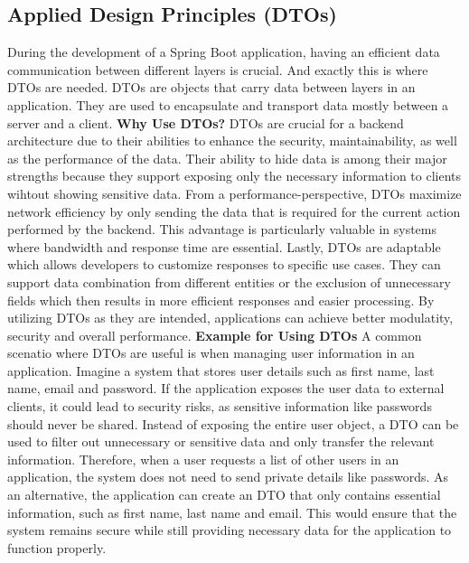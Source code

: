     \subsection{Applied Design Principles (DTOs)}
    During the development of a Spring Boot application, having an efficient data communication between different layers is crucial. And exactly this is where DTOs are needed. \newline
    DTOs are objects that carry data between layers in an application. They are used to encapsulate and transport data mostly between a server and a client.
    \newline
    \textbf{Why Use DTOs?} \newline
    DTOs are crucial for a backend architecture due to their abilities to enhance the security, maintainability, as well as the performance of the data. Their ability to hide data is among their major strengths because they support exposing only the necessary information to clients wihtout showing sensitive data. \newline
    From a performance-perspective, DTOs maximize network efficiency by only sending the data that is required for the current action performed by the backend. This advantage is particularly valuable in systems where bandwidth and response time are essential. \newline
    Lastly, DTOs are adaptable which allows developers to customize responses to specific use cases. They can support data combination from different entities or the exclusion of unnecessary fields which then results in more efficient responses and easier processing. \newline
    By utilizing DTOs as they are intended, applications can achieve better modulatity, security and overall performance. \newline
    \textbf{Example for Using DTOs} \newline
    A common scenatio where DTOs are useful is when managing user information in an application. \newline
    Imagine a system that stores user details such as first name, last name, email and password. If the application exposes the user data to external clients, it could lead to security risks, as sensitive information like passwords should never be shared. Instead of exposing the entire user object, a DTO can be used to filter out unnecessary or sensitive data and only transfer the relevant information. \newline
    Therefore, when a user requests a list of other users in an application, the system does not need to send private details like passwords. As an alternative, the application can create an DTO that only contains essential information, such as first name, last name and email. This would ensure that the system remains secure while still providing necessary data for the application to function properly. \newline
